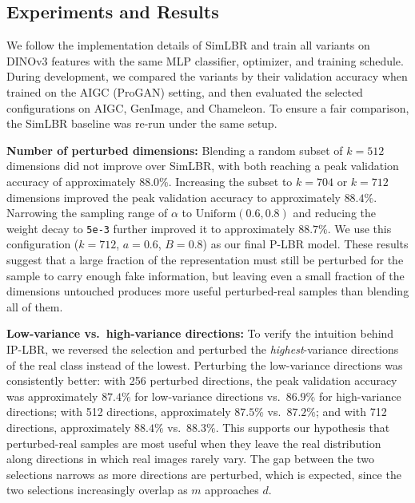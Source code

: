 \subsection{Experiments and Results}
\label{sec:plbr_results}
We follow the implementation details of SimLBR and train all variants on DINOv3 features with the same MLP classifier, optimizer, and training schedule. During development, we compared the variants by their validation accuracy when trained on the AIGC (ProGAN) setting, and then evaluated the selected configurations on AIGC, GenImage, and Chameleon. To ensure a fair comparison, the SimLBR baseline was re-run under the same setup. 

\noindent\textbf{Number of perturbed dimensions:} Blending a random subset of $k=512$ dimensions did not improve over SimLBR, with both reaching a peak validation accuracy of approximately $88.0\%$. Increasing the subset to $k=704$ or $k=712$ dimensions improved the peak validation accuracy to approximately $88.4\%$. Narrowing the sampling range of $\alpha$ to $\text{Uniform}(0.6, 0.8)$ and reducing the weight decay to \texttt{5e-3} further improved it to approximately $88.7\%$. We use this configuration ($k=712$, $a=0.6$, $B=0.8$) as our final P-LBR model. These results suggest that a large fraction of the representation must still be perturbed for the sample to carry enough fake information, but leaving even a small fraction of the dimensions untouched produces more useful perturbed-real samples than blending all of them. 

\noindent\textbf{Low-variance vs.\ high-variance directions:} To verify the intuition behind IP-LBR, we reversed the selection and perturbed the \textit{highest}-variance directions of the real class instead of the lowest. Perturbing the low-variance directions was consistently better: with 256 perturbed directions, the peak validation accuracy was approximately $87.4\%$ for low-variance directions vs.\ $86.9\%$ for high-variance directions; with 512 directions, approximately $87.5\%$ vs.\ $87.2\%$; and with 712 directions, approximately $88.4\%$ vs.\ $88.3\%$. This supports our hypothesis that perturbed-real samples are most useful when they leave the real distribution along directions in which real images rarely vary. The gap between the two selections narrows as more directions are perturbed, which is expected, since the two selections increasingly overlap as $m$ approaches $d$.

